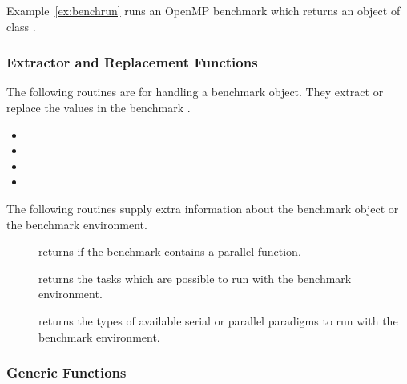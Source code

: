 Example~\ref{ex:benchrun} runs an OpenMP benchmark which returns an
object of class .




\subsubsection{Extractor and Replacement Functions}

The following routines are for handling a benchmark object. They
extract or replace the values in the benchmark .

\begin{itemize}
\item {}
\item {}
\item {}
\item {}
\end{itemize}

The following routines supply extra information about the benchmark object
or the benchmark environment.

\begin{description}
\item[] returns  if the benchmark
  contains a parallel function. 
\item[] returns the tasks which are possible to run
  with the benchmark environment.
\item[] returns the types of available serial or
  parallel paradigms to run with the benchmark environment.
\end{description}

\subsubsection{Generic Functions}

